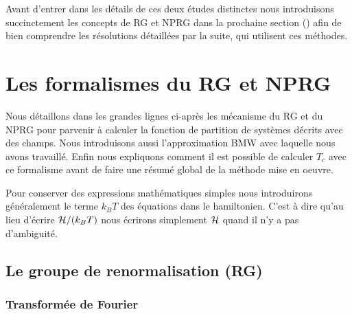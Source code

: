 \documentclass[10.5pt]{article}
\begin{document}
\begin{multicols*}{2}
Avant d'entrer dans les détails de ces deux études distinctes nous introduisons succinctement les concepts de RG et NPRG dans la prochaine section () afin de bien comprendre les résolutions détaillées par la suite, qui utilisent ces méthodes.

\newpage






\section{Les formalismes du RG et NPRG}

\label{sec:RGGeneral}

Nous détaillons dans les grandes lignes ci-après les mécanisme du RG et du NPRG pour parvenir à calculer la fonction de partition de systèmes décrits avec des champs. Nous introduisons aussi l'approximation BMW avec laquelle nous avons travaillé. Enfin nous expliquons comment il est possible de calculer $T_c$ avec ce formalisme avant de faire une résumé global de la méthode mise en oeuvre.

Pour conserver des expressions mathématiques simples nous introduirons généralement le terme $k_B T$ des équations dans le hamiltonien. C'est à dire qu'au lieu d'écrire $\mathcal{H}/(k_BT)$ nous écrirons simplement $\mathcal{H}$ quand il n'y a pas d'ambiguité.


\subsection{Le groupe de renormalisation (RG)}
\subsubsection{Transformée de Fourier}

\label{sec:TF}


\end{multicols*}
\end{document}
